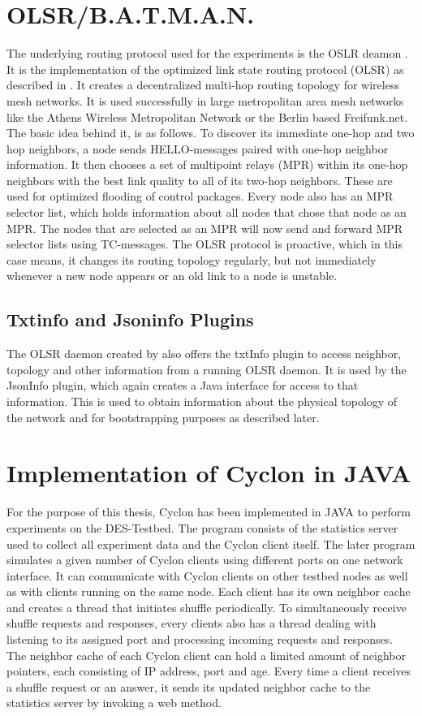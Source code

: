 \section{OLSR/B.A.T.M.A.N.} %
The underlying routing protocol used for the experiments is the OSLR deamon
\cite{Tonnesen2004}.
It is the implementation of the optimized link state routing protocol (OLSR) as
described in \cite{RFC3626}. It creates a decentralized multi-hop routing topology for
wireless mesh networks. It is used successfully in large metropolitan area mesh
networks like the Athens Wireless Metropolitan Network or the Berlin based Freifunk.net.
The basic idea behind it, is as follows. To discover its immediate one-hop and
two hop neighbors, a node sends HELLO-messages paired with one-hop neighbor
information. It then chooses a set of multipoint relays (MPR) within its one-hop
neighbors with the best link quality to all of its two-hop neighbors. These are
used for optimized flooding of control packages. Every node also has an MPR
selector list, which holds information about all nodes that chose that node
as an MPR. The nodes that are selected as an MPR will now send and forward MPR
selector lists using TC-messages. The OLSR protocol is proactive, which in this
case means, it changes its routing topology regularly, but not immediately
whenever a new node appears or an old link to a node is unstable.

\subsection{Txtinfo and Jsoninfo Plugins}
The OLSR daemon created by \cite{Tonnesen2004} also offers the txtInfo plugin
to access neighbor, topology and other information from a running OLSR
daemon. It is used by the JsonInfo plugin, which again creates a Java
interface for access to that information. This is used to obtain information
about the physical topology of the network and for bootstrapping purposes as
described later.

\section{Implementation of Cyclon in JAVA} %
For the purpose of this thesis, Cyclon has been implemented in JAVA to perform
experiments on the DES-Testbed. The program consists of the statistics server
used to collect all experiment data and the Cyclon client itself. The later
program simulates a given number of Cyclon clients using different ports on one
network interface. It can communicate with Cyclon clients on other testbed
nodes as well as with clients running on the same node. Each client has its own
neighbor cache and creates a thread that initiates shuffle periodically. To
simultaneously receive shuffle requests and responses, every clients also has a
thread dealing with listening to its assigned port and processing incoming
requests and responses. The neighbor cache of each Cyclon client can hold a
limited amount of neighbor pointers, each consisting of IP address, port and
age. Every time a client receives a shuffle request or an answer, it sends its
updated neighbor cache to the statistics server by invoking a web method.

